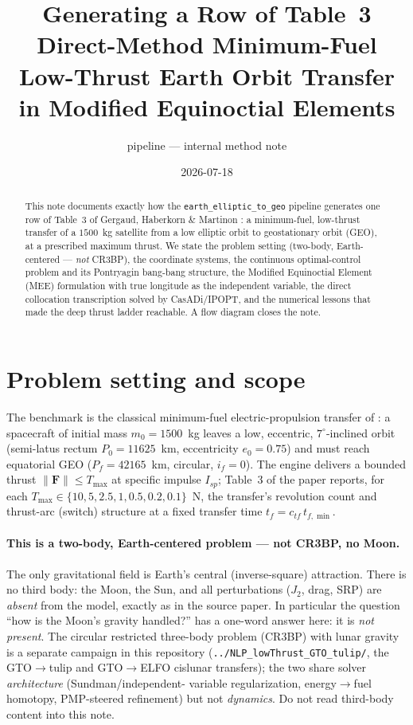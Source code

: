 \documentclass[11pt]{article}
\title{\vspace{-1.5em}Generating a Row of Table~3\\[2pt]
\large Direct-Method Minimum-Fuel Low-Thrust Earth Orbit Transfer\\
in Modified Equinoctial Elements}
\author{\normalsize \file{earth\_elliptic\_to\_geo} pipeline --- internal method note}
\date{\normalsize 2026-07-18}
\newcommand{\file}[1]{\texttt{\small #1}}
\newcommand{\Tmax}{T_{\max}}
\begin{document}
\maketitle
\vspace{-1.5em}

\begin{abstract}
\noindent
This note documents exactly how the \file{earth\_elliptic\_to\_geo} pipeline
generates one row of Table~3 of Gergaud, Haberkorn \& Martinon
\cite{ghm2004}: a minimum-fuel, low-thrust transfer of a $1500$~kg satellite
from a low elliptic orbit to geostationary orbit (GEO), at a prescribed maximum
thrust. We state the problem setting (two-body, Earth-centered --- \emph{not}
CR3BP), the coordinate systems, the continuous optimal-control problem and its
Pontryagin bang-bang structure, the Modified Equinoctial Element (MEE)
formulation with true longitude as the independent variable, the direct
collocation transcription solved by CasADi/IPOPT, and the numerical lessons that
made the deep thrust ladder reachable. A flow diagram closes the note.
\end{abstract}

\section{Problem setting and scope}

The benchmark is the classical minimum-fuel electric-propulsion transfer of
\cite{ghm2004}: a spacecraft of initial mass $m_0=1500$~kg leaves a low,
eccentric, $7^\circ$-inclined orbit (semi-latus rectum $P_0=11625$~km,
eccentricity $e_0=0.75$) and must reach equatorial GEO
($P_f = 42165$~km, circular, $i_f=0$). The engine delivers a bounded thrust
$\lVert \mathbf{F}\rVert \le \Tmax$ at specific impulse $I_{sp}$; Table~3 of the
paper reports, for each $\Tmax \in \{10,5,2.5,1,0.5,0.2,0.1\}$~N, the transfer's
revolution count and thrust-arc (switch) structure at a fixed transfer time
$t_f = c_{tf}\,t_{f,\min}$.

\paragraph{This is a two-body, Earth-centered problem --- not CR3BP, no Moon.}
The only gravitational field is Earth's central (inverse-square) attraction. There
is no third body: the Moon, the Sun, and all perturbations ($J_2$, drag, SRP) are
\emph{absent} from the model, exactly as in the source paper. In particular the
question ``how is the Moon's gravity handled?'' has a one-word answer here: it
is \emph{not present}. The circular restricted three-body problem (CR3BP) with
lunar gravity is a separate campaign in this repository
(\file{../NLP\_lowThrust\_GTO\_tulip/}, the GTO$\to$tulip and GTO$\to$ELFO
cislunar transfers); the two share solver \emph{architecture} (Sundman/independent-
variable regularization, energy$\to$fuel homotopy, PMP-steered refinement) but
not \emph{dynamics}. Do not read third-body content into this note.
\end{document}
